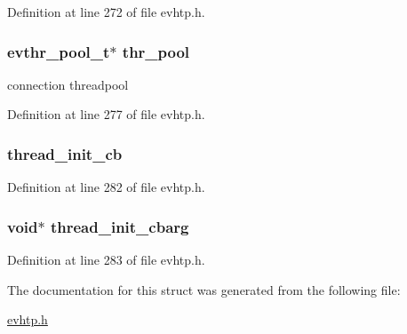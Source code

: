 \-Definition at line 272 of file evhtp.\-h.

\hypertarget{structevhtp__s_a350014aec537fdf8ef6f82efe17d5757}{
\subsubsection[{thr\-\_\-pool}]{\setlength{\rightskip}{0pt plus 5cm}evthr\-\_\-pool\-\_\-t$\ast$ {\bf thr\-\_\-pool}}}\label{structevhtp__s_a350014aec537fdf8ef6f82efe17d5757}
connection threadpool 

\-Definition at line 277 of file evhtp.\-h.

\hypertarget{structevhtp__s_af7bcd46ddf1d6d7dde1383c28f746e97}{
\subsubsection[{thread\-\_\-init\-\_\-cb}]{ {\bf thread\-\_\-init\-\_\-cb}}}\label{structevhtp__s_af7bcd46ddf1d6d7dde1383c28f746e97}


\-Definition at line 282 of file evhtp.\-h.

\hypertarget{structevhtp__s_aa7d8ed7967f5071085f57741dde79056}{
\subsubsection[{thread\-\_\-init\-\_\-cbarg}]{\setlength{\rightskip}{0pt plus 5cm}void$\ast$ {\bf thread\-\_\-init\-\_\-cbarg}}}\label{structevhtp__s_aa7d8ed7967f5071085f57741dde79056}


\-Definition at line 283 of file evhtp.\-h.



\-The documentation for this struct was generated from the following file\-:\begin{DoxyCompactItemize}
\item 
\hyperlink{evhtp_8h}{evhtp.\-h}\end{DoxyCompactItemize}
